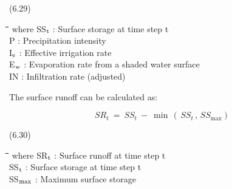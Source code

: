 \documentclass[11pt]{article}
\begin{document}
 \bigskip
\strut\hfill (6.29)
\nwln
\begin{tabbing}
\hspace{1.27cm}\=\hspace{1.27cm}\=\hspace{1.27cm}\=\hspace{1.27cm}\=%
\hspace{1.27cm}\=\hspace{1.27cm}\=\hspace{1.27cm}\=\hspace{1.27cm}\=%
\hspace{1.27cm}\=\hspace{1.27cm}\=\kill
where\> SS$_{{\rm t}}$\> : Surface storage at time step t\> \> \> \> \> \> \> \> [cm d$^{{\rm -1}}$]\\
\>P\> : Precipitation intensity\> \> \> \> \> \> \> \> [cm d$^{{\rm -1}}$]\\
\>I$_{{\rm e}}$\> : Effective irrigation rate\> \> \> \> \> \> \> \> [cm d$^{{\rm -1}}$]\\
\>E$_{{\rm w}}$\> : Evaporation rate from a shaded water surface\> \> \> \> \> \> \> \> [cm d$^{{\rm -1}}$]\\
\>IN\> : Infiltration rate (adjusted)\> \> \> \> \> \> \> \> [cm d$^{{\rm -1}}$]
\end{tabbing}

\bigskip
\bigskip
The surface runoff can be calculated as:

\begin{displaymath}
SR _{t} ~=~ SS _{t} ~-~ \min \, (\, SS _{t} \, ,\, SS _{\max } )
\end{displaymath}

 \bigskip
\strut\hfill (6.30)
\nwln
\begin{tabbing}
\hspace{1.27cm}\=\hspace{1.27cm}\=\hspace{1.27cm}\=\hspace{1.27cm}\=%
\hspace{1.27cm}\=\hspace{1.27cm}\=\hspace{1.27cm}\=\hspace{1.27cm}\=%
\hspace{1.27cm}\=\hspace{1.27cm}\=\kill
where\> SR$_{{\rm t}}$\> : Surface runoff at time step t\> \> \> \> \> \> \> \> [cm]\\
\>SS$_{{\rm t}}$\> : Surface storage at time step t\> \> \> \> \> \> \> \> [cm]\\
\>SS$_{{\rm max}}$\> : Maximum surface storage\> \> \> \> \> \> \> \> [cm]
\end{tabbing}
\end{document}
